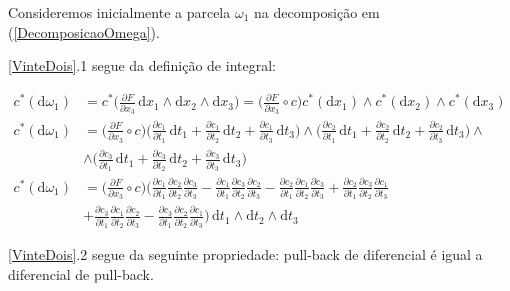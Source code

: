 \documentclass[12pt,a4paper]{article}
\begin{document}
		Consideremos inicialmente a parcela $\omega_1$ na decomposi\c{c}\~ao em (\ref{DecomposicaoOmega}).

		\ref{VinteDois}.1 segue da defini\c{c}\~ao de integral:

		\begin{align}
			c^*(\mathrm{d}\omega_1) &= c^*\biggl(\frac{\partial F}{\partial x_3} \,\mathrm{d}x_1 \wedge\mathrm{d}x_2 \wedge\mathrm{d}x_3\biggl) = \biggl( \frac{\partial F}{\partial x_3} \circ c \biggl) c^*(\mathrm{d}x_1) \wedge c^*(\mathrm{d}x_2) \wedge c^* (\mathrm{d}x_3) \\
			c^*(\mathrm{d}\omega_1) &= \biggl( \frac{\partial F}{\partial x_3} \circ c \biggl) \biggl(\frac{\partial c_1}{\partial t_1} \,\mathrm{d}t_1 + \frac{\partial c_1}{\partial t_2} \,\mathrm{d}t_2 + \frac{\partial c_1}{\partial t_3} \,\mathrm{d}t_3 \biggl)
				\wedge \biggl(\frac{\partial c_2}{\partial t_1} \,\mathrm{d}t_1 + \frac{\partial c_2}{\partial t_2} \,\mathrm{d}t_2 + \frac{\partial c_2}{\partial t_3} \,\mathrm{d}t_3 \biggl) \wedge \\
				&\wedge \biggl(\frac{\partial c_3}{\partial t_1} \,\mathrm{d}t_1 + \frac{\partial c_3}{\partial t_2} \,\mathrm{d}t_2 + \frac{\partial c_3}{\partial t_3} \,\mathrm{d}t_3 \biggl)  \\
			c^*(\mathrm{d}\omega_1) &= \biggl( \frac{\partial F}{\partial x_3} \circ c \biggl) \biggl(\frac{\partial c_1}{\partial t_1} \frac{\partial c_2}{\partial t_2} \frac{\partial c_3}{\partial t_3}
				- \frac{\partial c_1}{\partial t_1} \frac{\partial c_3}{\partial t_2} \frac{\partial c_2}{\partial t_3}
				- \frac{\partial c_2}{\partial t_1} \frac{\partial c_1}{\partial t_2} \frac{\partial c_3}{\partial t_3}
				+ \frac{\partial c_2}{\partial t_1} \frac{\partial c_3}{\partial t_2} \frac{\partial c_1}{\partial t_3} \\
				&+ \frac{\partial c_3}{\partial t_1} \frac{\partial c_1}{\partial t_2} \frac{\partial c_2}{\partial t_3}
				- \frac{\partial c_3}{\partial t_1} \frac{\partial c_2}{\partial t_2} \frac{\partial c_1}{\partial t_3}	\biggl) \,\mathrm{d}t_1 \wedge \mathrm{d}t_2 \wedge \mathrm{d}t_3
		\end{align}

		\ref{VinteDois}.2 segue da seguinte propriedade: pull-back de diferencial \'e igual a diferencial de pull-back.
\end{document}
